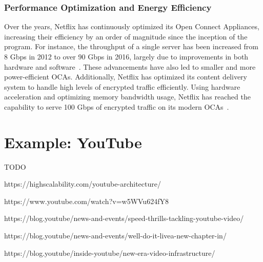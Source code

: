 \subsubsection{Performance Optimization and Energy Efficiency}

Over the years, Netflix has continuously optimized its Open Connect Appliances, increasing their efficiency by an order of magnitude since the inception of the program. For instance, the throughput of a single server has been increased from 8 Gbps in 2012 to over 90 Gbps in 2016, largely due to improvements in both hardware and software~\parencite{netflix_open_connect}. These advancements have also led to smaller and more power-efficient \ac{OCAs}.
Additionally, Netflix has optimized its content delivery system to handle high levels of encrypted traffic efficiently. Using hardware acceleration and optimizing memory bandwidth usage, Netflix has reached the capability to serve 100 Gbps of encrypted traffic on its modern \ac{OCAs}~\parencite{netflix_content_serving}.

\section{Example: YouTube}

TODO

https://highscalability.com/youtube-architecture/

https://www.youtube.com/watch?v=w5WVu624fY8

https://blog.youtube/news-and-events/speed-thrills-tackling-youtube-video/

https://blog.youtube/news-and-events/well-do-it-livea-new-chapter-in/

https://blog.youtube/inside-youtube/new-era-video-infrastructure/



